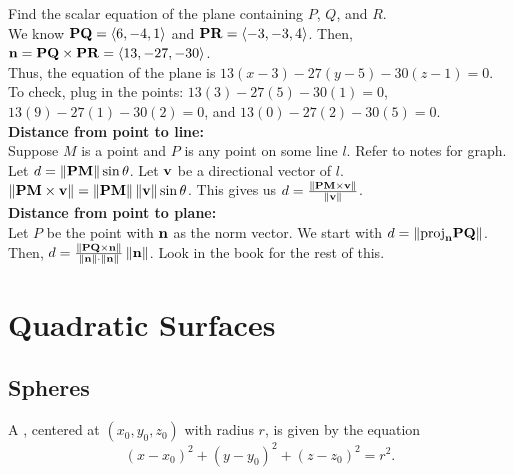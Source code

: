 Find the scalar equation of the plane containing \(P\), \(Q\), and \(R\). \\

We know \(\mathbf{PQ} = \left\langle 6,-4,1 \right\rangle\) and \(\mathbf{PR} = \left\langle -3,-3,4 \right\rangle\). Then, \(\mathbf{n} = \mathbf{PQ} \times \mathbf{PR} = \left\langle 13,-27,-30 \right\rangle\). \\

Thus, the equation of the plane is \(13(x - 3) - 27(y - 5) - 30(z - 1) = 0\). \\

To check, plug in the points: \(13(3) - 27(5) - 30(1) = 0\), \(13(9) - 27(1) - 30(2) = 0\), and \(13(0) - 27(2) - 30(5) = 0\). \\

\textbf{Distance from point to line:} \\

Suppose \(M\) is a point and \(P\) is any point on some line \(l\). Refer to notes for graph. Let \(d = \left\lVert \mathbf{PM}\right\rVert\sin \theta\). Let \(\mathbf{v}\) be a directional vector of \(l\). \\ 

\(\left\lVert \mathbf{PM \times v}\right\rVert = \left\lVert \mathbf{PM}\right\rVert\left\lVert \mathbf{v}\right\rVert\sin \theta\). This gives us \(d = \frac{\left\lVert \mathbf{PM \times v}\right\rVert}{\left\lVert \mathbf{v}\right\rVert}\). \\

\textbf{Distance from point to plane:} \\

Let \(P\) be the point with \(\mathbf{n}\) as the norm vector. We start with \(d = \left\lVert \mathbf{\text{proj}_{n}PQ}\right\rVert\). Then, \(d = \frac{\left\lVert \mathbf{PQ \times n}\right\rVert}{\left\lVert \mathbf{n}\right\rVert\cdot \left\lVert \mathbf{n}\right\rVert}\left\lVert \mathbf{n}\right\rVert\). Look in the book for the rest of this.




\newpage

\section{Quadratic Surfaces}

\subsection{Spheres}

A , centered at \((x_{0},y_{0},z_{0})\) with radius \(r\), is given by the equation
\[
    (x - x_{0})^{2} + (y - y_{0})^{2} + (z - z_{0})^{2} = r^{2}.
\]

